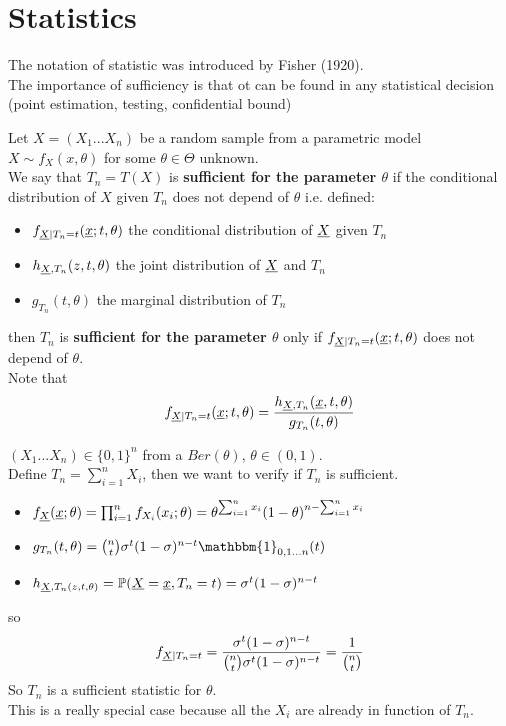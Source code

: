 \chapter{Statistics}
\vspace{15pt}



The notation of statistic was introduced by Fisher (1920).\\
The importance of sufficiency is that ot can be found in any statistical decision (point estimation, testing, confidential bound)
\begin{defi}
	Let $X=(X_1... X_n)$ be a random sample from a parametric model $X\sim f_X(x,\theta)$ for some $\theta \in \Theta$ unknown.\\
	We say that $T_n=T(X)$ is \textbf{sufficient for the parameter $\theta$} if the conditional distribution of $X$ given $T_n$ does not depend of $\theta$ i.e. defined:
	\begin{itemize}
		\item $f_{\underline X|T_n=t}(\underline x;t,\theta)$ the conditional distribution of $\underline X$ given $T_n$
		\item $h_{\underline X,T_n}(z,t,\theta)$ the joint distribution of $\underline X$ and $T_n$
		\item $g_{T_n}(t,\theta)$ the marginal distribution of $T_n$
	\end{itemize}
then $T_n$ is \textbf{sufficient for the parameter $\theta$} only if $f_{\underline X|T_n=t}(\underline x;t,\theta)$ does not depend of $\theta$.\\
Note that
\[
f_{\underline X|T_n=t}(\underline x;t,\theta)=\frac{h_{\underline X,T_n}(\underline x,t,\theta)}{g_{T_n}(t,\theta)}
\]
\end{defi}
\begin{eg} \label{eg:ber}
	$(X_1... X_n)\in \{0,1\}^n$ from a $Ber(\theta)$, $\theta \in (0,1)$.\\
	Define $T_n=\sum_{i=1}^{n}X_i$, then we want to verify if $T_n$ is sufficient.\\
	\begin{itemize}
		\item $f_{\underline X}(\underline x;\theta) = \prod_{i=1}^{n} f_{{X_i}}({x_i};\theta)=\theta^{\sum_{i=1}^{n}x_i}(1-\theta)^{n-\sum_{i=1}^{n}x_i}$
		\item$g_{T_n}(t,\theta)={{n}\choose{t}}\sigma^t(1-\sigma)^{n-t}\mathbbm{1}_{0,1...n}(t)$
		\item$h_{\underline X,T_n(z,t,\theta)}=\mathbb{P}(\underline X=\underline x,T_n=t)=\sigma^t(1-\sigma)^{n-t}$
	\end{itemize}
	so 
	$$f_{\underline X|T_n=t}=\frac{\sigma^t(1-\sigma)^{n-t}}{{{n}\choose{t}}\sigma^t(1-\sigma)^{n-t}}=\frac{1}{{{n}\choose{t}}}$$
	So $T_n$ is a sufficient statistic for $\theta$.\\
	This is a really special case because all the $X_i$ are already in function of $T_n$.
\end{eg}

